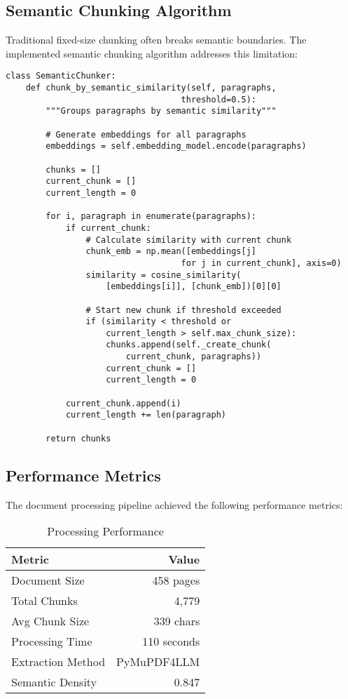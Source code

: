 \documentclass[10pt,a4paper,twocolumn]{article}
\begin{document}
\subsection{Semantic Chunking Algorithm}

Traditional fixed-size chunking often breaks semantic boundaries. The implemented semantic chunking algorithm addresses this limitation:

\begin{lstlisting}[caption={Semantic Chunking Algorithm}]
class SemanticChunker:
    def chunk_by_semantic_similarity(self, paragraphs, 
                                   threshold=0.5):
        """Groups paragraphs by semantic similarity"""
        
        # Generate embeddings for all paragraphs
        embeddings = self.embedding_model.encode(paragraphs)
        
        chunks = []
        current_chunk = []
        current_length = 0
        
        for i, paragraph in enumerate(paragraphs):
            if current_chunk:
                # Calculate similarity with current chunk
                chunk_emb = np.mean([embeddings[j] 
                                   for j in current_chunk], axis=0)
                similarity = cosine_similarity(
                    [embeddings[i]], [chunk_emb])[0][0]
                
                # Start new chunk if threshold exceeded
                if (similarity < threshold or 
                    current_length > self.max_chunk_size):
                    chunks.append(self._create_chunk(
                        current_chunk, paragraphs))
                    current_chunk = []
                    current_length = 0
            
            current_chunk.append(i)
            current_length += len(paragraph)
        
        return chunks
\end{lstlisting}

\subsection{Performance Metrics}

The document processing pipeline achieved the following performance metrics:

\begin{table}[H]
\centering
\small
\begin{tabular}{@{}lr@{}}
\toprule
\textbf{Metric} & \textbf{Value} \\
\midrule
Document Size & 458 pages \\
Total Chunks & 4,779 \\
Avg Chunk Size & 339 chars \\
Processing Time & 110 seconds \\
Extraction Method & PyMuPDF4LLM \\
Semantic Density & 0.847 \\
\bottomrule
\end{tabular}
\caption{Processing Performance}
\end{table}
\end{document}
